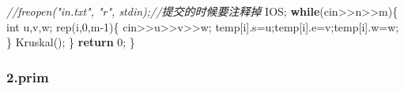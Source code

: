 \documentclass[
]{article}
\newenvironment{Shaded}{}{}
\newcommand{\CommentTok}[1]{\textcolor[rgb]{0.38,0.63,0.69}{\textit{#1}}}
\newcommand{\ControlFlowTok}[1]{\textcolor[rgb]{0.00,0.44,0.13}{\textbf{#1}}}
\newcommand{\DataTypeTok}[1]{\textcolor[rgb]{0.56,0.13,0.00}{#1}}
\newcommand{\DecValTok}[1]{\textcolor[rgb]{0.25,0.63,0.44}{#1}}
\newcommand{\NormalTok}[1]{#1}
\newcommand{\OperatorTok}[1]{\textcolor[rgb]{0.40,0.40,0.40}{#1}}
\begin{document}
\begin{Shaded}
\begin{Highlighting}[]
	\CommentTok{//freopen("in.txt", "r", stdin);//提交的时候要注释掉}
\NormalTok{	IOS}\OperatorTok{;}
	\ControlFlowTok{while}\OperatorTok{(}\NormalTok{cin}\OperatorTok{\textgreater{}\textgreater{}}\NormalTok{n}\OperatorTok{\textgreater{}\textgreater{}}\NormalTok{m}\OperatorTok{)\{}
		\DataTypeTok{int}\NormalTok{ u}\OperatorTok{,}\NormalTok{v}\OperatorTok{,}\NormalTok{w}\OperatorTok{;}
\NormalTok{		rep}\OperatorTok{(}\NormalTok{i}\OperatorTok{,}\DecValTok{0}\OperatorTok{,}\NormalTok{m}\OperatorTok{{-}}\DecValTok{1}\OperatorTok{)\{}
\NormalTok{			cin}\OperatorTok{\textgreater{}\textgreater{}}\NormalTok{u}\OperatorTok{\textgreater{}\textgreater{}}\NormalTok{v}\OperatorTok{\textgreater{}\textgreater{}}\NormalTok{w}\OperatorTok{;}
\NormalTok{			temp}\OperatorTok{[}\NormalTok{i}\OperatorTok{].}\NormalTok{s}\OperatorTok{=}\NormalTok{u}\OperatorTok{;}\NormalTok{temp}\OperatorTok{[}\NormalTok{i}\OperatorTok{].}\NormalTok{e}\OperatorTok{=}\NormalTok{v}\OperatorTok{;}\NormalTok{temp}\OperatorTok{[}\NormalTok{i}\OperatorTok{].}\NormalTok{w}\OperatorTok{=}\NormalTok{w}\OperatorTok{;}
		\OperatorTok{\}}
\NormalTok{		Kruskal}\OperatorTok{();}
	\OperatorTok{\}}
	\ControlFlowTok{return} \DecValTok{0}\OperatorTok{;}
\OperatorTok{\}}
\end{Highlighting}
\end{Shaded}

\hypertarget{2prim}{%
\subsubsection{2.prim}\label{2prim}}
\end{document}
